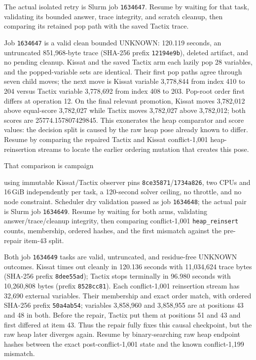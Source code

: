 \documentclass[11pt]{article}
\newcommand{\code}[1]{\texttt{#1}}
\newcommand{\artifact}[1]{\path{#1}}
\begin{document}
The actual isolated retry is Slurm job \code{1634647}. Resume by waiting for
that task, validating its bounded answer, trace integrity, and scratch cleanup,
then comparing its retained pop path with the saved Tactix trace.

Job \code{1634647} is a valid clean bounded UNKNOWN: 120.119 seconds, an
untruncated 851,968-byte trace (SHA-256 prefix \code{12194e9b}), deleted
artifact, and no pending cleanup. Kissat and the saved Tactix arm each lazily
pop 28 variables, and the popped-variable sets are identical. Their first pop
paths agree through seven child moves; the next move is Kissat variable
3,778,844 from index 410 to 204 versus Tactix variable 3,778,692 from index
408 to 203. Pop-root order first differs at operation 12. On the final relevant
promotion, Kissat moves 3,782,012 above equal-score 3,782,027 while Tactix moves
3,782,027 above 3,782,012; both scores are 25774.157807429845. This exonerates
the heap comparator and score values: the decision split is caused by the raw
heap pose already known to differ. Resume by comparing the repaired Tactix and
Kissat conflict-1,001 heap-reinsertion streams to locate the earlier ordering
mutation that creates this pose.

That comparison is campaign
\begin{center}\small\artifact{20260819-1325-tierd-rank22-repaired-reinsert-sequence}\end{center}
using immutable Kissat/Tactix observer pins \code{8ce35871}/\code{1734a826},
two CPUs and 16\,GiB independently per task, a 120-second solver ceiling, no
throttle, and no node constraint. Scheduler dry validation passed as job
\code{1634648}; the actual pair is Slurm job \code{1634649}. Resume by waiting
for both arms, validating answer/trace/cleanup integrity, then comparing
conflict-1,001 \code{heap\_reinsert} counts, membership, ordered hashes, and
the first mismatch against the pre-repair item-43 split.

Both job \code{1634649} tasks are valid, untruncated, and residue-free UNKNOWN
outcomes. Kissat times out cleanly in 120.136 seconds with 11,034,624 trace
bytes (SHA-256 prefix \code{8dee55ad}); Tactix stops terminally in 96.980
seconds with 10,260,808 bytes (prefix \code{8528cc81}). Each conflict-1,001
reinsertion stream has 32,690 external variables. Their membership and exact
order match, with ordered SHA-256 prefix \code{50a4ab54}; variables 3,858,960
and 3,858,955 are at positions 43 and 48 in both. Before the repair, Tactix put
them at positions 51 and 43 and first differed at item 43. Thus the repair fully
fixes this causal checkpoint, but the raw heap later diverges again. Resume by
binary-searching raw heap endpoint hashes between the exact post-conflict-1,001
state and the known conflict-1,199 mismatch.
\end{document}
